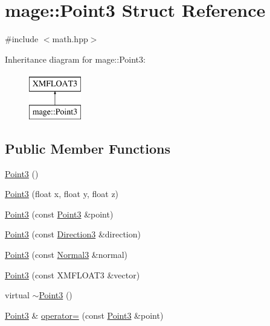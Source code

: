 \hypertarget{structmage_1_1_point3}{}\section{mage\+:\+:Point3 Struct Reference}
\label{structmage_1_1_point3}


{\ttfamily \#include $<$math.\+hpp$>$}

Inheritance diagram for mage\+:\+:Point3\+:\begin{figure}[H]
\begin{center}
\leavevmode
\includegraphics[height=2.000000cm]{structmage_1_1_point3}
\end{center}
\end{figure}
\subsection*{Public Member Functions}
\begin{DoxyCompactItemize}
\item 
\hyperlink{structmage_1_1_point3_a2675c303e54c6047520bc1a298c7fef1}{Point3} ()
\item 
\hyperlink{structmage_1_1_point3_a754210fa30befab6db5957a8d9b397f2}{Point3} (float x, float y, float z)
\item 
\hyperlink{structmage_1_1_point3_ad2e95e6eaa32339663e35f936990eb0c}{Point3} (const \hyperlink{structmage_1_1_point3}{Point3} \&point)
\item 
\hyperlink{structmage_1_1_point3_a5ccb5f2f660b3ecdb471ed859923d4fc}{Point3} (const \hyperlink{structmage_1_1_direction3}{Direction3} \&direction)
\item 
\hyperlink{structmage_1_1_point3_ae56d0fb055b286df68d8d645378408c8}{Point3} (const \hyperlink{structmage_1_1_normal3}{Normal3} \&normal)
\item 
\hyperlink{structmage_1_1_point3_a2298bfe2417508187bdad7fbaa6178c1}{Point3} (const X\+M\+F\+L\+O\+A\+T3 \&vector)
\item 
virtual \hyperlink{structmage_1_1_point3_a6bdc329ad2ec6f812a2b7ed1d153b54b}{$\sim$\+Point3} ()
\item 
\hyperlink{structmage_1_1_point3}{Point3} \& \hyperlink{structmage_1_1_point3_a53403b16c67a6c7d72910edaec04e371}{operator=} (const \hyperlink{structmage_1_1_point3}{Point3} \&point)
\end{DoxyCompactItemize}


